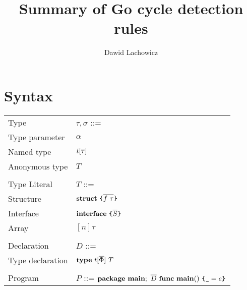 \documentclass[12pt]{article}
\title{Summary of Go cycle detection rules}
\author{Dawid Lachowicz}
\begin{document}
\maketitle

\section{Syntax}

\begin{minipage}[t]{\textwidth}
    \begin{tabular}[t]{ll}
        Type                   & $\tau, \sigma$ ::=                                        \\
        \quad Type parameter   & \quad $\alpha$                                            \\
        \quad Named type       & \quad $t[\overline{\tau}]$                                      \\
        \quad Anonymous type   & \quad $T$                                                 \\\\
        Type Literal           & $T$ ::=                                                   \\
        \quad Structure        & \quad $\texttt{\bf struct}~\texttt{\{}\overline{f~\tau}\texttt{\}}$                          \\
        \quad Interface        & \quad $\texttt{\bf interface}~\texttt{\{}\overline{S}\texttt{\}}$                            \\
        \quad Array            & \quad$[n]\tau$                                            \\
        \\
        Declaration            & $D$ ::=                                                   \\
        \quad Type declaration & \quad $\texttt{\bf type}~t[\overline{\Phi}]~T$                              \\
        \\
        Program                & $P$ ::= $\texttt{\bf package}~\texttt{\bf main};~\overline{D}~\texttt{\bf func}~\texttt{\bf main}()~\texttt{\{}\texttt{\textunderscore}=e\texttt{\}}$
    \end{tabular}
\end{minipage}
\hspace{-0.5\textwidth}
\end{document}
